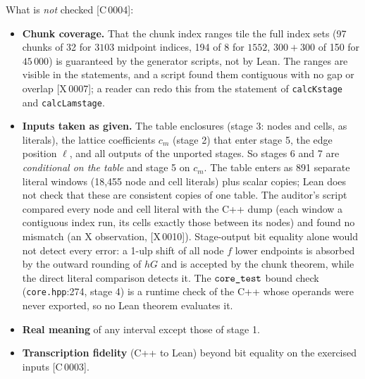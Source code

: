 \documentclass[10pt]{article}
\newcommand{\tg}[2]{\texorpdfstring{\textsf{[#1\,#2]}}{}}  %
\newcommand{\lean}[1]{\texttt{#1}}
\renewcommand{\_}{\textunderscore\allowbreak}
\begin{document}
What is \emph{not} checked \tg{C}{0004}:
\begin{itemize}
\item \textbf{Chunk coverage.} That the chunk index ranges tile the full index sets (97 chunks of 32 for $3103$ midpoint indices, 194 of 8 for $1552$, $300+300$ of 150 for $45\,000$) is guaranteed by the generator scripts, not by Lean. The ranges are visible in the statements, and a script found them contiguous with no gap or overlap \tg{X}{0007}; a reader can redo this from the statement of \lean{calcK\_stage} and \lean{calcLam\_stage}.
\item \textbf{Inputs taken as given.} The table enclosures (stage 3: nodes and cells, as literals), the lattice coefficients $c_m$ (stage 2) that enter stage 5, the edge position $\ell$, and all outputs of the unported stages. So stages 6 and 7 are \emph{conditional on the table} and stage 5 on $c_m$. The table enters as 891 separate literal windows (18{,}455 node and cell literals) plus scalar copies; Lean does not check that these are consistent copies of one table. The auditor's script compared every node and cell literal with the C++ dump (each window a contiguous index run, its cells exactly those between its nodes) and found no mismatch (an X observation, \tg{X}{0010}). Stage-output bit equality alone would not detect every error: a 1-ulp shift of all node $f$ lower endpoints is absorbed by the outward rounding of $hG$ and is accepted by the chunk theorem, while the direct literal comparison detects it. The $\texttt{core\_test}$ bound check (\texttt{core.hpp}:274, stage 4) is a runtime check of the C++ whose operands were never exported, so no Lean theorem evaluates it.
\item \textbf{Real meaning} of any interval except those of stage 1.
\item \textbf{Transcription fidelity} (C++ to Lean) beyond bit equality on the exercised inputs \tg{C}{0003}.
\end{itemize}
\end{document}

